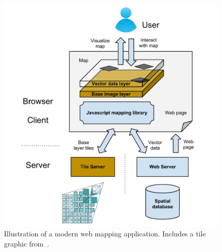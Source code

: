 \begin{figure}[h]
  \begin{center}
    \includegraphics[width=1\textwidth]{figures/web_mapping_stack.pdf}
    \caption{Illustration of a modern web mapping application. Includes a tile graphic from~\cite{web:cubeservtiles}.}
    \label{fig:web-mapping-stack}
  \end{center}
\end{figure}















